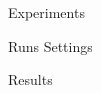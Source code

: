 
\begin{section}{Experiments}

\begin{subsection}{Runs Settings}
\end{subsection}

\begin{subsection}{Results}
\end{subsection}

\end{section}

